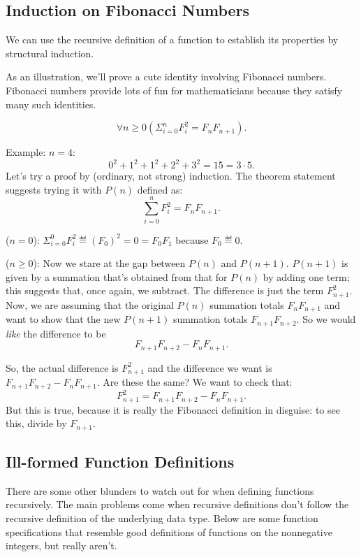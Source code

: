 \begin{editingnotes}

\subsection{Induction on Fibonacci Numbers}

We can use the recursive definition of a function to establish its
properties by structural induction.

As an illustration, we'll prove a cute identity involving Fibonacci
numbers.  Fibonacci numbers provide lots of fun for mathematicians because
they satisfy many such identities.
\begin{proposition}
\[
\forall n \geq 0 (\Sigma_{i=0}^n F_i^2 = F_n F_{n+1}).
\]
\end{proposition}

Example: $n = 4$:
\[
0^2 + 1^2 + 1^2 + 2^2 + 3^2 = 15 = 3 \cdot 5.
\]
Let's try a proof by (ordinary, not strong) induction.  The theorem
statement suggests trying it with $P(n)$ defined as:
\[
\sum_{i=0}^n F_i^2 = F_n F_{n+1}.
\]

 ($n=0$):
$\Sigma_{i=0}^0 F_i^2 \eqdef (F_0)^2 = 0 = F_0 F_1$ because
$F_0 \eqdef 0$.

 ($n\geq 0$): Now we stare at the gap
between $P(n)$ and $P(n+1)$.  $P(n+1)$ is given by a summation that's
obtained from that for $P(n)$ by adding one term; this suggests that,
once again, we subtract.  The difference is just the term $F_{n+1}^2$.
Now, we are assuming that the original $P(n)$ summation totals $F_n
F_{n+1}$ and want to show that the new $P(n+1)$ summation totals
$F_{n+1} F_{n+2}$.  So we would \emph{like} the difference to be
\[
F_{n+1} F_{n+2} - F_n F_{n+1}.
\]

So, the actual difference is $F_{n+1}^2$ and the difference we want is
$F_{n+1} F_{n+2} - F_n F_{n+1}$.  Are these the same?  We want to check
that:
\[
F_{n+1}^2 = F_{n+1} F_{n+2} - F_n F_{n+1}.
\]
But this is true, because it is really the Fibonacci definition in
disguise: to see this, divide by $F_{n+1}$.

\end{editingnotes}

\subsection{Ill-formed Function Definitions}

There are some other blunders to watch out for when defining functions
recursively.  The main problems come when recursive definitions don't
follow the recursive definition of the underlying data type.  Below are
some function specifications that resemble good definitions of functions
on the nonnegative integers, but really aren't.

